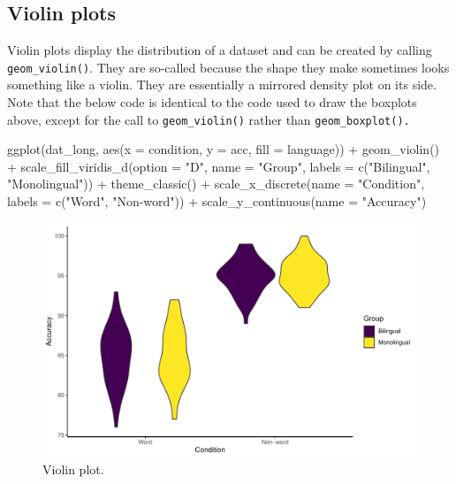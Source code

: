 \documentclass[
  english,
  doc,floatsintext]{apa6}
\newenvironment{Shaded}{\begin{snugshade}}{\end{snugshade}}
\newcommand{\AttributeTok}[1]{\textcolor[rgb]{0.77,0.63,0.00}{#1}}
\newcommand{\FunctionTok}[1]{\textcolor[rgb]{0.00,0.00,0.00}{#1}}
\newcommand{\NormalTok}[1]{#1}
\newcommand{\SpecialCharTok}[1]{\textcolor[rgb]{0.00,0.00,0.00}{#1}}
\newcommand{\StringTok}[1]{\textcolor[rgb]{0.31,0.60,0.02}{#1}}
\begin{document}
\hypertarget{violin-plots}{%
\subsection{Violin plots}\label{violin-plots}}

Violin plots display the distribution of a dataset and can be created by calling \texttt{geom\_violin()}. They are so-called because the shape they make sometimes looks something like a violin. They are essentially a mirrored density plot on its side. Note that the below code is identical to the code used to draw the boxplots above, except for the call to \texttt{geom\_violin()} rather than \texttt{geom\_boxplot().}

\begin{Shaded}
\begin{Highlighting}[]
\FunctionTok{ggplot}\NormalTok{(dat\_long, }\FunctionTok{aes}\NormalTok{(}\AttributeTok{x =}\NormalTok{ condition, }\AttributeTok{y =}\NormalTok{ acc, }\AttributeTok{fill =}\NormalTok{ language)) }\SpecialCharTok{+}
  \FunctionTok{geom\_violin}\NormalTok{() }\SpecialCharTok{+}
  \FunctionTok{scale\_fill\_viridis\_d}\NormalTok{(}\AttributeTok{option =} \StringTok{"D"}\NormalTok{,}
                       \AttributeTok{name =} \StringTok{"Group"}\NormalTok{,}
                       \AttributeTok{labels =} \FunctionTok{c}\NormalTok{(}\StringTok{"Bilingual"}\NormalTok{, }\StringTok{"Monolingual"}\NormalTok{)) }\SpecialCharTok{+}
  \FunctionTok{theme\_classic}\NormalTok{() }\SpecialCharTok{+}
  \FunctionTok{scale\_x\_discrete}\NormalTok{(}\AttributeTok{name =} \StringTok{"Condition"}\NormalTok{,}
                   \AttributeTok{labels =} \FunctionTok{c}\NormalTok{(}\StringTok{"Word"}\NormalTok{, }\StringTok{"Non{-}word"}\NormalTok{)) }\SpecialCharTok{+}
  \FunctionTok{scale\_y\_continuous}\NormalTok{(}\AttributeTok{name =} \StringTok{"Accuracy"}\NormalTok{)}
\end{Highlighting}
\end{Shaded}

\begin{figure}

{\centering \includegraphics[width=1\linewidth]{images/violin1-1} 

}

\caption{Violin plot.}\label{fig:violin1}
\end{figure}
\end{document}
